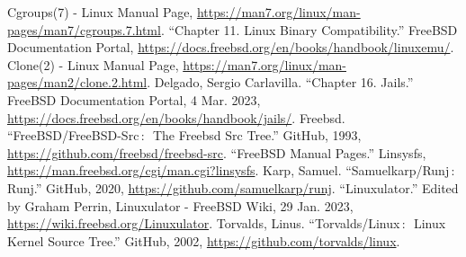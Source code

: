 \documentclass[12pt, dvipsnames, a4paper]{article}
\begin{document}
\begin{thebibliography}{00}
	 Cgroups(7) - Linux Manual Page, \href{https://man7.org/linux/man-pages/man7/cgroups.7.html}{https://man7.org/linux/man-pages/man7/cgroups.7.html}. 
	 “Chapter 11. Linux Binary Compatibility.” FreeBSD Documentation Portal, \href{https://docs.freebsd.org/en/books/handbook/linuxemu/}{https://docs.freebsd.org/en/books/handbook/linuxemu/}.	
	 Clone(2) - Linux Manual Page, \href{https://man7.org/linux/man-pages/man2/clone.2.html}{https://man7.org/linux/man-pages/man2/clone.2.html}.	
	 Delgado, Sergio  Carlavilla. “Chapter 16. Jails.” FreeBSD Documentation Portal, 4 Mar. 2023, \href{https://docs.freebsd.org/en/books/handbook/jails/}{https://docs.freebsd.org/en/books/handbook/jails/}.
	 Freebsd. “FreeBSD/FreeBSD-Src$\,\colon\,$ The Freebsd Src Tree.” GitHub, 1993, \href{https://github.com/freebsd/freebsd-src}{https://github.com/freebsd/freebsd-src}.
	 “FreeBSD Manual Pages.” Linsysfs, \href{https://man.freebsd.org/cgi/man.cgi?linsysfs}{https://man.freebsd.org/cgi/man.cgi?linsysfs}.
	 Karp, Samuel. “Samuelkarp/Runj$\,\colon\,$ Runj.” GitHub, 2020, \href{https://github.com/samuelkarp/runj}{https://github.com/samuelkarp/runj}.	
	 “Linuxulator.” Edited by Graham Perrin, Linuxulator - FreeBSD Wiki, 29 Jan. 2023, \href{https://wiki.freebsd.org/Linuxulator}{https://wiki.freebsd.org/Linuxulator}.
	 Torvalds, Linus. “Torvalds/Linux$\,\colon\,$ Linux Kernel Source Tree.” GitHub, 2002, \href{https://github.com/torvalds/linux}{https://github.com/torvalds/linux}. 



\end{thebibliography}
\end{document}
